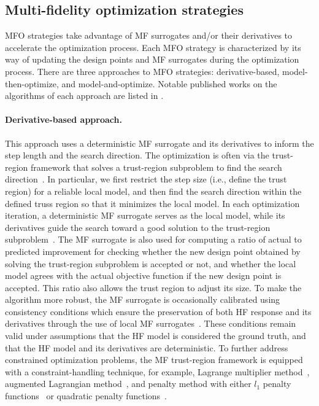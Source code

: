 \documentclass[iicol,sn-basic]{sn-jnl}%
\begin{document}
\subsection{Multi-fidelity optimization strategies}\label{Sec23}

MFO strategies take advantage of MF surrogates and/or their derivatives to accelerate the optimization process.
Each MFO strategy is characterized by its way of updating the design points and MF surrogates during the optimization process.
There are three approaches to MFO strategies: derivative-based, model-then-optimize, and model-and-optimize.
Notable published works on the algorithms of each approach are listed in .

\paragraph{Derivative-based approach.}
This approach uses a deterministic MF surrogate and its derivatives to inform the step length and the search direction. 
The optimization is often via the trust-region framework that solves a trust-region subproblem to find the search direction~\citep{Nocedal2006}.
In particular, we first restrict the step size (i.e., define the trust region) for a reliable local model, and then find the search direction within the defined truss region so that it minimizes the local model.
In each optimization iteration, a deterministic MF surrogate serves as the local model, while its derivatives guide the search toward a good solution to the trust-region subproblem~\citep{Alexandrov1998,Alexandrov2001,Robinson2008}.
The MF surrogate is also used for computing a ratio of actual to predicted improvement for checking whether the new design point obtained by solving the  trust-region subproblem is accepted or not, and whether the local model agrees with the actual objective function if the new design point is accepted.
This ratio also allows the trust region to adjust its size.
To make the algorithm more robust, the MF surrogate is occasionally
calibrated using consistency conditions which ensure the preservation of both HF response and its derivatives through the use of local MF surrogates~\citep{Alexandrov1998,Alexandrov2001}.
These conditions remain valid under assumptions that the HF model is considered the ground truth, and that the HF model and its derivatives are deterministic.
To further address constrained optimization problems, the MF trust-region framework is equipped with a constraint-handling technique, for example, Lagrange multiplier method~\citep{Robinson2008,March2011}, augmented Lagrangian method~\citep{Alexandrov2001}, and penalty method with either $l_1$ penalty functions~\citep{Alexandrov2001,Gano2005} or quadratic penalty functions~\citep{Elham2015}.
\end{document}
